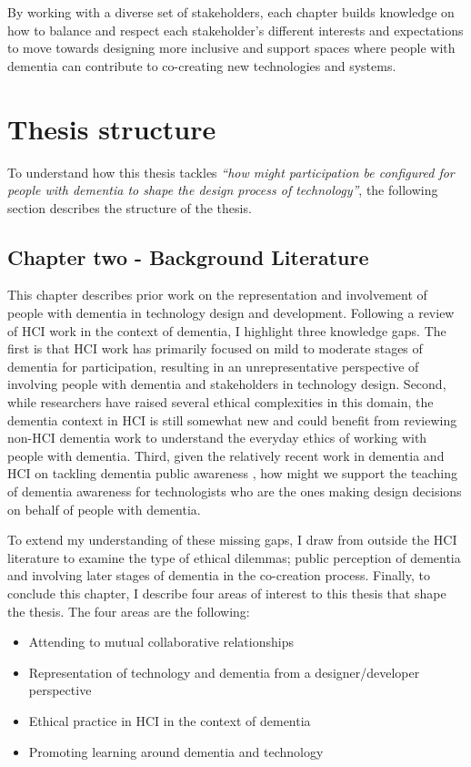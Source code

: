 By working with a diverse set of stakeholders, each chapter builds knowledge on how to balance and respect each stakeholder's different interests and expectations to move towards designing more inclusive and support spaces where people with dementia can contribute to co-creating new technologies and systems.

\section{Thesis structure}
\label{Intro: Thesis structure}
To understand how this thesis tackles \textit{``how might participation be configured for people with dementia to shape the design process of technology''}, the following section describes the structure of the thesis.

\subsection{Chapter two - Background Literature}
\label{Intro:ChapterTwo}
This chapter describes prior work on the representation and involvement of people with dementia in technology design and development. Following a review of HCI work in the context of dementia, I highlight three knowledge gaps. The first is that HCI work has primarily focused on mild to moderate stages of dementia for participation, resulting in an unrepresentative perspective of involving people with dementia and stakeholders in technology design. Second, while researchers have raised several ethical complexities in this domain, the dementia context in HCI is still somewhat new and could benefit from reviewing non-HCI dementia work to understand the everyday ethics of working with people with dementia. Third, given the relatively recent work in dementia and HCI on tackling dementia public awareness \citep{lazar_safe_2019,talbot_how_2020}, how might we support the teaching of dementia awareness for technologists who are the ones making design decisions on behalf of people with dementia.  

To extend my understanding of these missing gaps, I draw from outside the HCI literature to examine the type of ethical dilemmas; public perception of dementia and involving later stages of dementia in the co-creation process. Finally, to conclude this chapter, I describe four areas of interest to this thesis that shape the thesis. The four areas are the following: 
\begin{itemize}
    \item Attending to mutual collaborative relationships
    \item Representation of technology and dementia from a designer/developer perspective
    \item Ethical practice in HCI in the context of dementia
    \item Promoting learning around dementia and technology
\end{itemize}


